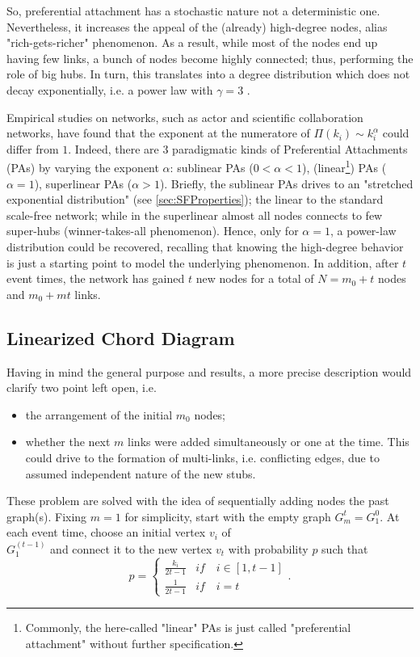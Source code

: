 \documentclass[a4paper,12pt,twoside]{book} %
\theoremstyle{definition}
\begin{document}
So, preferential attachment has a stochastic nature not a deterministic one. Nevertheless, it increases the appeal of the (already) high-degree nodes, alias \label{cit:S.Sagone} "rich-gets-richer" phenomenon. As a result, while most of the nodes end up having few links, a bunch of nodes become highly connected; thus, performing the role of big hubs. In turn, this translates into a degree distribution which does not decay exponentially, i.e. a power law with $\gamma = 3$ \cite{barabasi::2016networkbook}. 

Empirical studies on networks, such as actor and scientific collaboration networks, have found that the exponent at the numeratore of $\Pi(k_i) \sim k_i^\alpha$ could differ from $1$.
Indeed, there are $3$ paradigmatic kinds of Preferential Attachments (PAs) by varying the exponent $\alpha$: sublinear PAs ($0<\alpha<1$), (linear\footnote{Commonly, the here-called "linear" PAs is just called "preferential attachment" without further specification.}) PAs ($\alpha = 1$), superlinear PAs ($\alpha>1$). Briefly, the sublinear PAs drives to an "stretched exponential distribution" (see \autoref{sec:SFProperties}); the linear to the standard scale-free network; while in the superlinear almost all nodes connects to few super-hubs (winner-takes-all phenomenon).
Hence, only for $\alpha = 1$, a power-law distribution could be recovered, recalling that knowing the high-degree behavior is just a starting point to model the underlying phenomenon. 
In addition, after $t$ event times, the network has gained $t$ new nodes for a total of $N = m_0 + t$ nodes and $m_0 + mt$ links.

\subsection{Linearized Chord Diagram}
Having in mind the general purpose and results, a more precise description would clarify two point left open, i.e. 
\begin{itemize}
	\item the arrangement of the initial $m_0$ nodes;
	\item whether the next $m$ links were added simultaneously or one at the time. This could drive to the formation of multi-links, i.e. conflicting edges, due to assumed independent nature of the new stubs. 
\end{itemize}

These problem are solved with the idea of sequentially adding nodes the past graph(s).
Fixing $m=1$ for simplicity, start with the empty graph $G_{m}^t = G_1^0$.
At each event time, choose an initial vertex $v_i$ of \\ $G_1^{(t-1)}$ and connect it to the new vertex $v_t$ with probability $p$ such that
\begin{equation}
	p =
	\begin{cases}
		\frac{k_i}{2t-1} & if \quad i \in [1,t-1] \\
		\frac{1}{2t-1} & if \quad i = t
	\end{cases}
	.
\end{equation}
\end{document}
